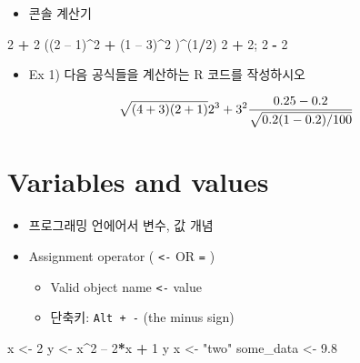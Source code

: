 \documentclass[
]{book}
\newenvironment{Shaded}{\begin{snugshade}}{\end{snugshade}}
\newcommand{\DecValTok}[1]{\textcolor[rgb]{0.00,0.00,0.81}{#1}}
\newcommand{\FloatTok}[1]{\textcolor[rgb]{0.00,0.00,0.81}{#1}}
\newcommand{\NormalTok}[1]{#1}
\newcommand{\OperatorTok}[1]{\textcolor[rgb]{0.81,0.36,0.00}{\textbf{#1}}}
\newcommand{\StringTok}[1]{\textcolor[rgb]{0.31,0.60,0.02}{#1}}
\providecommand{\tightlist}{%
  \setlength{\itemsep}{0pt}\setlength{\parskip}{0pt}}
\begin{document}
\begin{itemize}
\tightlist
\item
  콘솔 계산기
\end{itemize}

\begin{Shaded}
\begin{Highlighting}[]
\DecValTok{2} \OperatorTok{+}\StringTok{ }\DecValTok{2}
\NormalTok{((}\DecValTok{2}\NormalTok{ – }\DecValTok{1}\NormalTok{)}\OperatorTok{\^{}}\DecValTok{2} \OperatorTok{+}\StringTok{ }\NormalTok{(}\DecValTok{1}\NormalTok{ – }\DecValTok{3}\NormalTok{)}\OperatorTok{\^{}}\DecValTok{2}\NormalTok{ )}\OperatorTok{\^{}}\NormalTok{(}\DecValTok{1}\OperatorTok{/}\DecValTok{2}\NormalTok{)}
\DecValTok{2} \OperatorTok{+}\StringTok{ }\DecValTok{2}\NormalTok{; }\DecValTok{2} \OperatorTok{{-}}\StringTok{ }\DecValTok{2}
\end{Highlighting}
\end{Shaded}

\begin{itemize}
\tightlist
\item
  Ex 1) 다음 공식들을 계산하는 R 코드를 작성하시오
\end{itemize}

\[
\sqrt{(4+3)(2+1)} \\
2^3 + 3^2 \\
\frac{0.25 - 0.2}{\sqrt{0.2 (1-0.2)/100}}
\]

\hypertarget{variables-and-values}{%
\section{Variables and values}\label{variables-and-values}}

\begin{itemize}
\tightlist
\item
  프로그래밍 언에어서 변수, 값 개념
\item
  Assignment operator ( \texttt{\textless{}-} OR \texttt{=} )

  \begin{itemize}
  \tightlist
  \item
    Valid object name \texttt{\textless{}-} value
  \item
    단축키: \texttt{Alt\ +\ -} (the minus sign)
  \end{itemize}
\end{itemize}

\begin{Shaded}
\begin{Highlighting}[]
\NormalTok{x <{-}}\StringTok{ }\DecValTok{2}
\NormalTok{y <{-}}\StringTok{ }\NormalTok{x}\OperatorTok{\^{}}\DecValTok{2}\NormalTok{ – }\DecValTok{2}\OperatorTok{*}\NormalTok{x }\OperatorTok{+}\StringTok{ }\DecValTok{1}
\NormalTok{y}
\NormalTok{x <{-}}\StringTok{ "two"}  
\NormalTok{some\_data <{-}}\StringTok{ }\FloatTok{9.8}
\end{Highlighting}
\end{Shaded}
\end{document}
